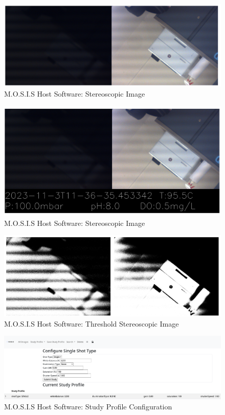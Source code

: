\documentclass[12pt]{article}
\begin{document}
\begin{figure}[H]
	\includegraphics[width=\textwidth]{Figures/stereoscopic_image.png}
	\caption{M.O.S.I.S Host Software: Stereoscopic Image}
\end{figure}
\begin{figure}[H]
	\includegraphics[width=\textwidth]{Figures/tagged_stereoscopic_image.png}
	\caption{M.O.S.I.S Host Software: Stereoscopic Image}
\end{figure}
\begin{figure}[H]
	\includegraphics[width=\textwidth]{Figures/threshold_image.png}
	\caption{M.O.S.I.S Host Software: Threshold Stereoscopic Image}
\end{figure}
\begin{figure}[H]
	\includegraphics[width=\textwidth]{Figures/study_profile_configuration.png}
	\caption{M.O.S.I.S Host Software: Study Profile Configuration}
\end{figure}
\end{document}
